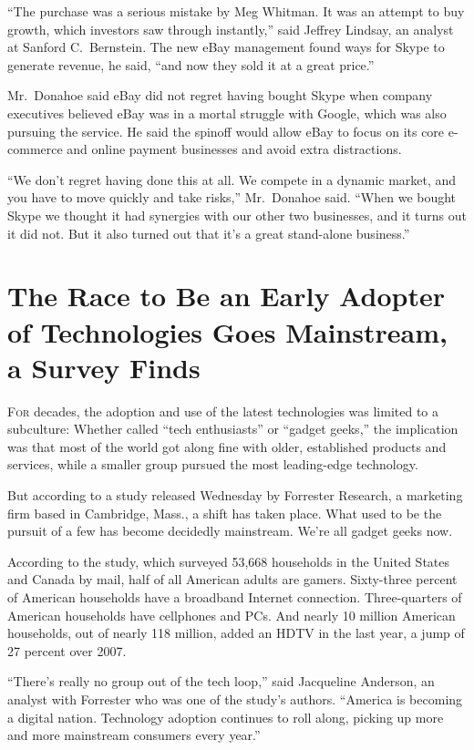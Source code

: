﻿\documentclass[12pt]{article}
\begin{document}
``The purchase was a serious mistake by Meg Whitman. It was an attempt to buy growth, which
investors saw through instantly,'' said Jeffrey Lindsay, an analyst at Sanford C.~Bernstein. The new
eBay management found ways for Skype to generate revenue, he said, ``and now they sold it at a great
price.''

Mr.~Donahoe said eBay did not regret having bought Skype when company executives believed eBay was
in a mortal struggle with Google, which was also pursuing the service. He said the spinoff would
allow eBay to focus on its core e-commerce and online payment businesses and avoid extra
distractions.

``We don't regret having done this at all. We compete in a dynamic market, and you have to move
quickly and take risks,'' Mr.~Donahoe said. ``When we bought Skype we thought it had synergies with
our other two businesses, and it turns out it did not. But it also turned out that it's a great
stand-alone business.''

\section{The Race to Be an Early Adopter of Technologies Goes Mainstream, a Survey Finds}

\lettrine{F}{or} decades, the adoption and use of the latest technologies was limited to a
subculture: Whether called ``tech enthusiasts'' or ``gadget geeks,'' the implication was that most
of the world got along fine with older, established products and services, while a smaller group
pursued the most leading-edge technology.

But according to a study released Wednesday by Forrester Research, a marketing firm based in
Cambridge, Mass., a shift has taken place. What used to be the pursuit of a few has become decidedly
mainstream. We're all gadget geeks now.

According to the study, which surveyed 53,668 households in the United States and Canada by mail,
half of all American adults are gamers. Sixty-three percent of American households have a broadband
Internet connection. Three-quarters of American households have cellphones and PCs. And nearly 10
million American households, out of nearly 118 million, added an HDTV in the last year, a jump of 27
percent over 2007.

``There's really no group out of the tech loop,'' said Jacqueline Anderson, an analyst with
Forrester who was one of the study's authors. ``America is becoming a digital nation. Technology
adoption continues to roll along, picking up more and more mainstream consumers every year.''
\end{document}
